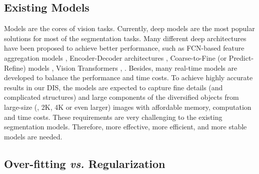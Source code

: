 \documentclass[10pt,twocolumn,letterpaper]{article}
\begin{document}
\subsection{Existing Models} 
Models are the cores of vision tasks. 
Currently, deep models are the most popular solutions for most of the segmentation tasks. 
Many different deep architectures have been proposed to achieve better performance, such as FCN-based \cite{long2015fully} feature aggregation models \cite{DBLP:conf/iccv/ZhangWLWY17, luo2017non, hou2017deeply, DBLP:conf/ijcai/ZhangLLS18, DBLP:conf/eccv/ChenTWH18, WangSCJDZLMTWLX19,zhao2020suppress,wei2020f3net}, Encoder-Decoder architectures \cite{badrinarayanan2017segnet,ronneberger2015u,qin2020u2,chen2020global}, 
Coarse-to-Fine (or Predict-Refine) models \cite{DBLP:conf/iccv/WangBZZL17, deng2018r3net, wang2018detect,qin2019basnet,cheng2020cascadepsp,HRRN_ICCV2021,DBLP:journals/corr/abs-2108-11515}, 
Vision Transformers \cite{zheng2020rethinking,liu2021visual}, \etc. 
Besides, many real-time models \cite{zhao2018icnet,yu2018bisenet,li2019dfanet,orsic2019defense,hu2020temporally,Fan_2021_CVPR,nirkin2020hyperseg} are developed to balance the performance and time costs. To achieve highly accurate results in our DIS, the models are expected to capture fine details (and complicated structures) and large components of the diversified objects from large-size (\eg, 2K, 4K or even larger) images with affordable memory, computation and time costs. These requirements are very challenging to the existing segmentation models. 
Therefore, more effective, more efficient, and more stable models are needed. 



\subsection{Over-fitting \textit{vs.} Regularization} 
\end{document}
